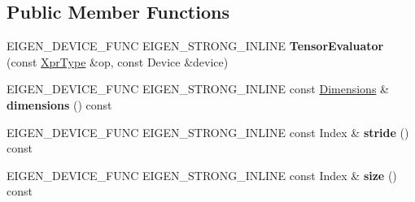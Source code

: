 \subsection*{Public Member Functions}
\begin{DoxyCompactItemize}
\item 
\mbox{\label{struct_eigen_1_1_tensor_evaluator_3_01const_01_tensor_scan_op_3_01_op_00_01_arg_type_01_4_00_01_device_01_4_a2ee167468283faaf509984424b79d9bd}} 
E\+I\+G\+E\+N\+\_\+\+D\+E\+V\+I\+C\+E\+\_\+\+F\+U\+NC E\+I\+G\+E\+N\+\_\+\+S\+T\+R\+O\+N\+G\+\_\+\+I\+N\+L\+I\+NE {\bfseries Tensor\+Evaluator} (const \hyperlink{class_eigen_1_1_tensor_scan_op}{Xpr\+Type} \&op, const Device \&device)
\item 
\mbox{\label{struct_eigen_1_1_tensor_evaluator_3_01const_01_tensor_scan_op_3_01_op_00_01_arg_type_01_4_00_01_device_01_4_a2c8e67b83117c15c8cd436e8b0ac6488}} 
E\+I\+G\+E\+N\+\_\+\+D\+E\+V\+I\+C\+E\+\_\+\+F\+U\+NC E\+I\+G\+E\+N\+\_\+\+S\+T\+R\+O\+N\+G\+\_\+\+I\+N\+L\+I\+NE const \hyperlink{struct_eigen_1_1_d_sizes}{Dimensions} \& {\bfseries dimensions} () const
\item 
\mbox{\label{struct_eigen_1_1_tensor_evaluator_3_01const_01_tensor_scan_op_3_01_op_00_01_arg_type_01_4_00_01_device_01_4_aad8a85e2ceb4bf7de446bdd4ff39ce1e}} 
E\+I\+G\+E\+N\+\_\+\+D\+E\+V\+I\+C\+E\+\_\+\+F\+U\+NC E\+I\+G\+E\+N\+\_\+\+S\+T\+R\+O\+N\+G\+\_\+\+I\+N\+L\+I\+NE const Index \& {\bfseries stride} () const
\item 
\mbox{\label{struct_eigen_1_1_tensor_evaluator_3_01const_01_tensor_scan_op_3_01_op_00_01_arg_type_01_4_00_01_device_01_4_a1f77913e3f7a993e930a20e045319342}} 
E\+I\+G\+E\+N\+\_\+\+D\+E\+V\+I\+C\+E\+\_\+\+F\+U\+NC E\+I\+G\+E\+N\+\_\+\+S\+T\+R\+O\+N\+G\+\_\+\+I\+N\+L\+I\+NE const Index \& {\bfseries size} () const
\item 
\mbox{\label{struct_eigen_1_1_tensor_evaluator_3_01const_01_tensor_scan_op_3_01_op_00_01_arg_type_01_4_00_01_device_01_4_afc6b1a085bb45c4218227c2ecb42d1d5}} 

\end{DoxyCompactItemize}

